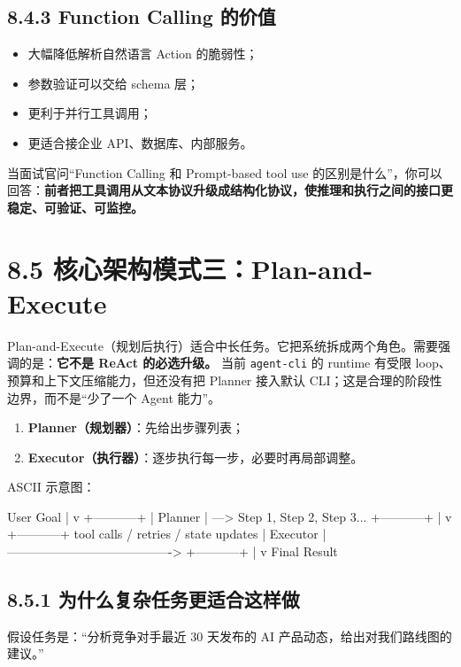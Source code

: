 \subsection{8.4.3 Function Calling 的价值}

\begin{itemize}[leftmargin=2em]
\item 大幅降低解析自然语言 Action 的脆弱性；
\item 参数验证可以交给 schema 层；
\item 更利于并行工具调用；
\item 更适合接企业 API、数据库、内部服务。
\end{itemize}

当面试官问``Function Calling 和 Prompt-based tool use 的区别是什么''，你可以回答：\textbf{前者把工具调用从文本协议升级成结构化协议，使推理和执行之间的接口更稳定、可验证、可监控。}


\section{8.5 核心架构模式三：Plan-and-Execute}

Plan-and-Execute（规划后执行）适合中长任务。它把系统拆成两个角色。需要强调的是：\textbf{它不是 ReAct 的必选升级。} 当前 \texttt{agent-cli} 的 runtime 有受限 loop、预算和上下文压缩能力，但还没有把 Planner 接入默认 CLI；这是合理的阶段性边界，而不是``少了一个 Agent 能力''。


\begin{enumerate}[leftmargin=2em]
\item \textbf{Planner（规划器）}：先给出步骤列表；
\item \textbf{Executor（执行器）}：逐步执行每一步，必要时再局部调整。
\end{enumerate}

ASCII 示意图：


\begin{codeblock}
User Goal
   |
   v
+-----------+
|  Planner  | ---> Step 1, Step 2, Step 3...
+-----------+
   |
   v
+-----------+    tool calls / retries / state updates
| Executor  | ---------------------------------------->
+-----------+
   |
   v
 Final Result
\end{codeblock}

\subsection{8.5.1 为什么复杂任务更适合这样做}

假设任务是：``分析竞争对手最近 30 天发布的 AI 产品动态，给出对我们路线图的建议。''


